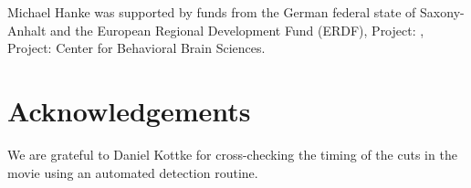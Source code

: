 \documentclass[10pt,a4paper,twocolumn]{article}
\begin{document}
Michael Hanke was supported by funds from the German federal state of
Saxony-Anhalt and the European Regional Development Fund (ERDF), Project: ,
Project: Center for Behavioral Brain Sciences.

\section*{Acknowledgements}
We are grateful to Daniel Kottke for cross-checking the timing of the cuts in
the movie using an automated detection routine.

{\small
}
\end{document}
